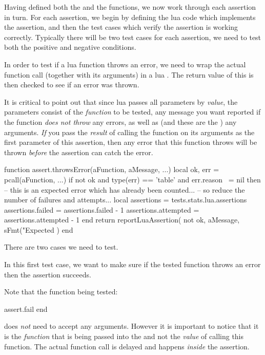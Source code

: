 Having defined both the  and the  
functions, we now work through each assertion in turn. For each assertion, 
we begin by defining the lua code which implements the assertion, and then 
the test cases which verify the assertion is working correctly. Typically 
there will be two test cases for each assertion, we need to test both the 
positive and negative conditions. 


In order to test if a lua function throws an error, we need to wrap the 
actual function call (together with its arguments) in a lua . 
The return value of this  is then checked to see if an error 
was thrown. 

It is critical to point out that since lua passes all parameters by 
\emph{value}, the  parameters consist of the 
\emph{function} to be tested, any message you want reported if the 
function \emph{does not throw} any errors, as well as (and these are the 
) any arguments. \emph{If} you pass the \emph{result} of 
calling the function on its arguments as the first parameter of this 
assertion, then any error that this function throws will be thrown 
\emph{before} the assertion can catch the error. 

\startLuaCode
function assert.throwsError(aFunction, aMessage, ...)
  local ok, err = pcall(aFunction, ...)
  if not ok and type(err) == 'table' and err.reason ~= nil then 
    -- this is an expected error which has already been counted...
    -- so reduce the number of failures and attempts...
    local assertions = tests.stats.lua.assertions
    assertions.failed    = assertions.failed    - 1
    assertions.attempted = assertions.attempted - 1
  end
  return reportLuaAssertion(
    not ok,
    aMessage,
    sFmt("Expected %
  )
end
\stopLuaCode

There are two cases we need to test.


In this first test case, we want to make sure if the tested function 
throws an error then the assertion succeeds.

Note that the function being tested: 

\starttyping[option=lua]
  assert.fail
end
\stoptyping

\noindent does \emph{not} need to accept any arguments. However it is 
important to notice that it is the \emph{function} that is being passed 
into the  and not the \emph{value} of calling 
this function. The actual function call is delayed and happens 
\emph{inside} the assertion. 

